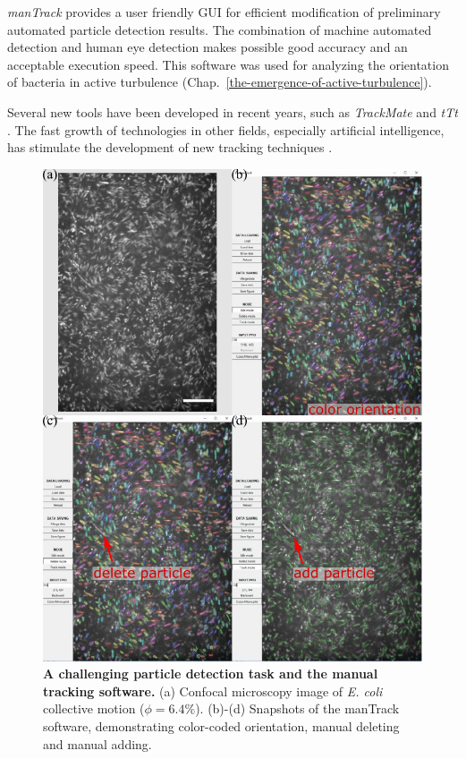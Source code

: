 \textit{manTrack} provides a user friendly GUI for efficient modification of preliminary automated particle detection results. The combination of machine automated detection and human eye detection makes possible good accuracy and an acceptable execution speed. This software was used for analyzing the orientation of bacteria in active turbulence (Chap.~\ref{the-emergence-of-active-turbulence}).

Several new tools have been developed in recent years, such as \textit{TrackMate} and \textit{tTt} \cite{Tinevez2017, Hilsenbeck2016}. The fast growth of technologies in other fields, especially artificial intelligence, has stimulate the development of new tracking techniques \cite{Newby2018, Moen2019}.

\begin{figure}[!ht]
	\begin{center}
	\includegraphics[height=5.5 in]{Figs/2-Exp/6.pdf}
	\end{center}
	\caption[A challenging particle detection task and the manual tracking software]
	{
	\textbf{A challenging particle detection task and the manual tracking software.}
	(a) Confocal microscopy image of \textit{E. coli} collective motion ($\phi=6.4\%$).
	(b)-(d) Snapshots of the manTrack software, demonstrating color-coded orientation, manual deleting and manual adding.
	}
	\label{fig:2-6}
\end{figure}

